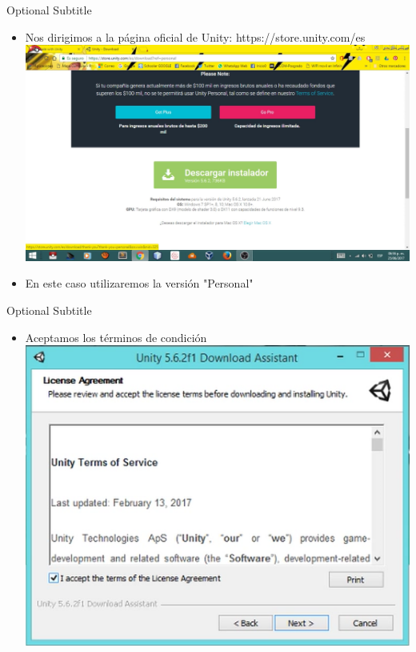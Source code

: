 \documentclass{beamer}
\begin{document}
\begin{frame}{01}{Optional Subtitle}
  \begin{itemize}
  \item {
    Nos dirigimos a la página oficial de Unity:
    https://store.unity.com/es
  }
  \includegraphics[width=\linewidth]{image/IU01}
  \item {
    En este caso utilizaremos la versión "Personal"
  }
  \end{itemize}
\end{frame}

\begin{frame}{02}{Optional Subtitle}
  \begin{itemize}
  \item {
    Aceptamos los términos de condición
  }
  \includegraphics[width=\linewidth]{image/IU02}
  \end{itemize}
\end{frame}
\end{document}
